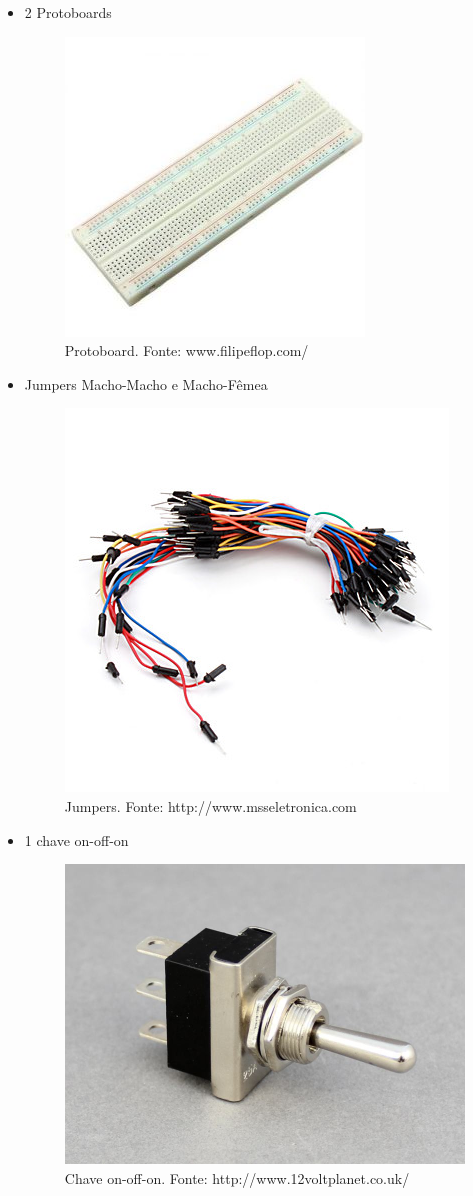 \documentclass[conference]{IEEEtran}
\begin{document}
\begin{itemize}
  \item 2 Protoboards
    \begin{figure}[H]
      \centering
      \includegraphics[width=0.5\linewidth]{protoboard}
      \caption{Protoboard. Fonte: www.filipeflop.com/}
      \label{fig:protoboard}
    \end{figure}

  \item Jumpers Macho-Macho e Macho-Fêmea
    \begin{figure}[H]
      \centering
      \includegraphics[width=0.5\linewidth]{jumper}
      \caption{Jumpers. Fonte: http://www.msseletronica.com}
      \label{fig:jumper}
    \end{figure}

  \item 1 chave on-off-on
    \begin{figure}[H]
      \centering
      \includegraphics[width=0.5\linewidth]{switch}
      \caption{Chave on-off-on. Fonte: http://www.12voltplanet.co.uk/}
      \label{fig:switch}
    \end{figure}


\end{itemize}
\end{document}
